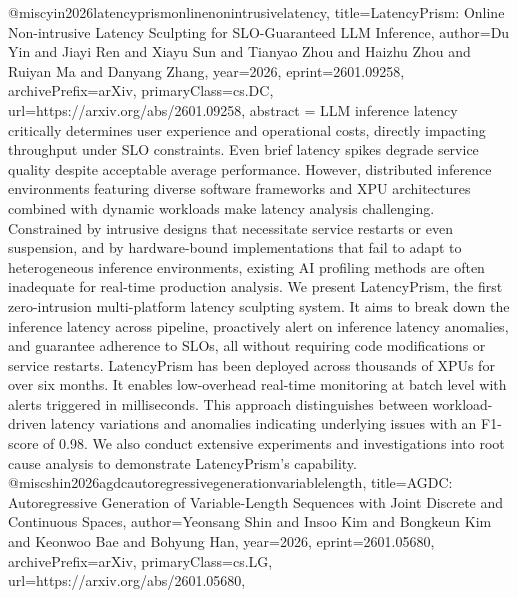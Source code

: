 {}@misc{yin2026latencyprismonlinenonintrusivelatency,
      title={LatencyPrism: Online Non-intrusive Latency Sculpting for SLO-Guaranteed LLM Inference}, 
      author={Du Yin and Jiayi Ren and Xiayu Sun and Tianyao Zhou and Haizhu Zhou and Ruiyan Ma and Danyang Zhang},
      year={2026},
      eprint={2601.09258},
      archivePrefix={arXiv},
      primaryClass={cs.DC},
      url={https://arxiv.org/abs/2601.09258},
      abstract = {LLM inference latency critically determines user experience and operational costs, directly impacting throughput under SLO constraints. Even brief latency spikes degrade service quality despite acceptable average performance. However, distributed inference environments featuring diverse software frameworks and XPU architectures combined with dynamic workloads make latency analysis challenging. Constrained by intrusive designs that necessitate service restarts or even suspension, and by hardware-bound implementations that fail to adapt to heterogeneous inference environments, existing AI profiling methods are often inadequate for real-time production analysis.   We present LatencyPrism, the first zero-intrusion multi-platform latency sculpting system. It aims to break down the inference latency across pipeline, proactively alert on inference latency anomalies, and guarantee adherence to SLOs, all without requiring code modifications or service restarts. LatencyPrism has been deployed across thousands of XPUs for over six months. It enables low-overhead real-time monitoring at batch level with alerts triggered in milliseconds. This approach distinguishes between workload-driven latency variations and anomalies indicating underlying issues with an F1-score of 0.98. We also conduct extensive experiments and investigations into root cause analysis to demonstrate LatencyPrism's capability.}
}@misc{shin2026agdcautoregressivegenerationvariablelength,
      title={AGDC: Autoregressive Generation of Variable-Length Sequences with Joint Discrete and Continuous Spaces}, 
      author={Yeonsang Shin and Insoo Kim and Bongkeun Kim and Keonwoo Bae and Bohyung Han},
      year={2026},
      eprint={2601.05680},
      archivePrefix={arXiv},
      primaryClass={cs.LG},
      url={https://arxiv.org/abs/2601.05680},
}
